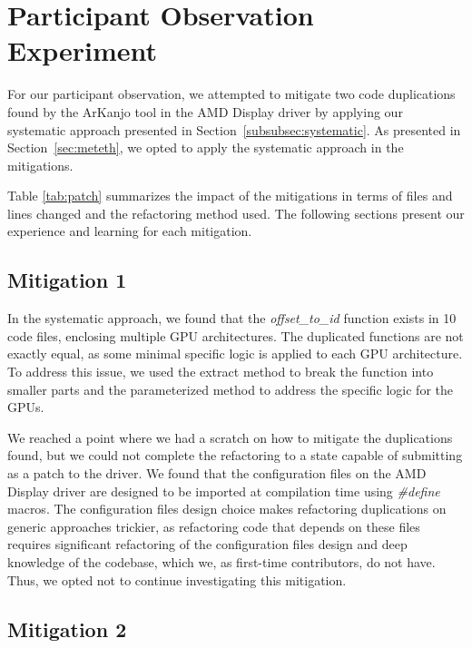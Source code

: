 \en

\section{Participant Observation Experiment}

For our participant observation, we attempted to mitigate two code 
duplications found by the ArKanjo tool in the AMD Display driver by applying 
our systematic approach presented in Section~\ref{subsubsec:systematic}. 
As presented in Section~\ref{sec:meteth},
we opted to apply the systematic approach in the mitigations.

Table \ref{tab:patch} summarizes the impact of the mitigations in terms of 
files and lines changed and the refactoring method used. The following sections
present our experience and learning for each mitigation.



\subsection{Mitigation 1}

In the systematic approach, we found that the \textit{offset\_to\_id} function
exists in 10 code files, enclosing multiple GPU architectures. The duplicated
functions are not exactly equal, as some minimal specific logic is applied to 
each GPU architecture. To address this issue, we used the extract method to
break the function into smaller parts and the parameterized method to address
the specific logic for the GPUs.

We reached a point where we had a scratch on how to mitigate the duplications found, 
but we could not complete the refactoring to a state capable of submitting as a 
patch to the driver. We found that the configuration files on the AMD Display 
driver are designed to be imported at compilation time using \textit{\#define} macros. 
The configuration files design choice makes refactoring duplications on generic 
approaches trickier, as refactoring code that depends on these files requires 
significant refactoring of the configuration files design and deep knowledge 
of the codebase, which we, as first-time contributors, do not have. Thus, we opted 
not to continue investigating this mitigation.


\subsection{Mitigation 2}


